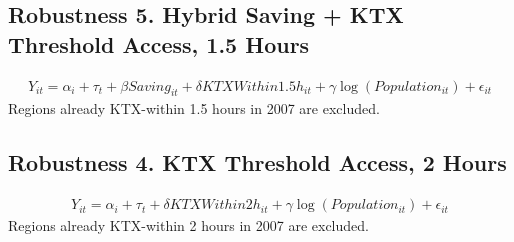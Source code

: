 \documentclass[a4paper, 10pt]{article}
\begin{document}
\begin{table}[H]
\centering
\caption{Robustness 4. KTX Threshold Access, 1.5 Hours: 의사}

\end{table}

\subsection{Robustness 5. Hybrid Saving + KTX Threshold Access, 1.5 Hours}
\begin{align*}
    Y_{it}=\alpha_i+\tau_t+\beta Saving_{it}+\delta KTXWithin1.5h_{it}+\gamma\log(Population_{it})+\epsilon_{it}
\end{align*}
Regions already KTX-within 1.5 hours in 2007 are excluded.
\begin{table}[H]
\centering
\caption{Robustness 5. Hybrid Saving + KTX Threshold Access, 1.5 Hours: 의원}

\end{table}

\begin{table}[H]
\centering
\caption{Robustness 5. Hybrid Saving + KTX Threshold Access, 1.5 Hours: 병원}

\end{table}

\begin{table}[H]
\centering
\caption{Robustness 5. Hybrid Saving + KTX Threshold Access, 1.5 Hours: 종합병원}

\end{table}

\begin{table}[H]
\centering
\caption{Robustness 5. Hybrid Saving + KTX Threshold Access, 1.5 Hours: 상급종합병원}

\end{table}

\begin{table}[H]
\centering
\caption{Robustness 5. Hybrid Saving + KTX Threshold Access, 1.5 Hours: 의사}

\end{table}

\subsection{Robustness 4. KTX Threshold Access, 2 Hours}
\begin{align*}
    Y_{it}=\alpha_i+\tau_t+\delta KTXWithin2h_{it}+\gamma\log(Population_{it})+\epsilon_{it}
\end{align*}
Regions already KTX-within 2 hours in 2007 are excluded.
\begin{table}[H]
\centering
\caption{Robustness 4. KTX Threshold Access, 2 Hours: 의원}

\end{table}
\end{document}

